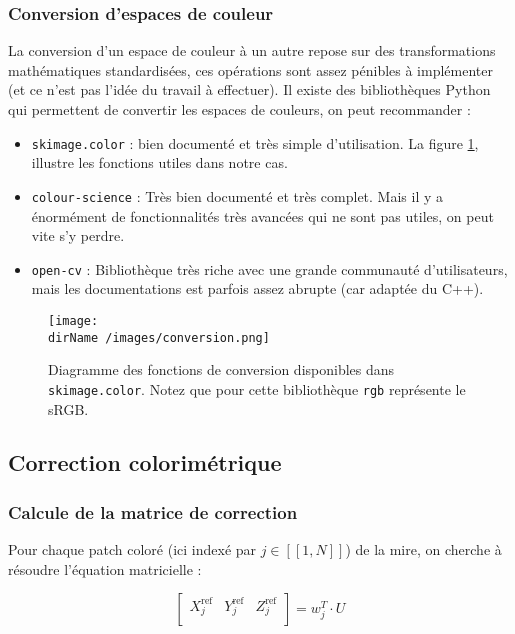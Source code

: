 \subsubsection{Conversion d'espaces de couleur}
La conversion d'un espace de couleur à un autre repose sur des transformations mathématiques standardisées, ces opérations sont assez pénibles à implémenter (et ce n'est pas l'idée du travail à effectuer). 
Il existe des bibliothèques Python qui permettent de convertir les espaces de couleurs, on peut recommander :
\begin{itemize}
	\item \texttt{skimage.color} : bien documenté et très simple d'utilisation. La figure \ref{conversion}, illustre les fonctions utiles dans notre cas. 
	\item \texttt{colour-science} : Très bien documenté et très complet. Mais il y a énormément de fonctionnalités très avancées qui ne sont pas utiles, on peut vite s'y perdre.
	\item \texttt{open-cv} : Bibliothèque très riche avec une grande communauté d'utilisateurs, mais les documentations est parfois assez abrupte (car adaptée du C++).  
\end{itemize}

\begin{figure}[h]
	\centering
		\texttt{[image: \\dirName /images/conversion.png]}
		\caption{Diagramme des fonctions de conversion disponibles dans \texttt{skimage.color}. Notez que pour cette bibliothèque \texttt{rgb} représente le sRGB.}
	\label{conversion}
\end{figure}

\subsection{Correction colorimétrique}

\subsubsection{Calcule de la matrice de correction}
Pour chaque patch coloré (ici indexé par $j \in [\![ 1, N  ]\!]$) de la mire, on cherche à résoudre l'équation matricielle : 

\begin{equation}
    \begin{bmatrix}
        X_j^\text{ref} & Y_j^\text{ref}  & Z_j^\text{ref} \\
    \end{bmatrix}
    =  w_j^T \cdot U
	\label{equation matriciel simple}
\end{equation}

